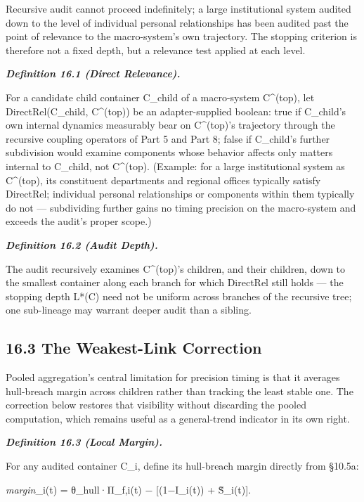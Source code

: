 \documentclass[
]{article}
\begin{document}
Recursive audit cannot proceed indefinitely; a large institutional
system audited down to the level of individual personal relationships
has been audited past the point of relevance to the macro-system's own
trajectory. The stopping criterion is therefore not a fixed depth, but a
relevance test applied at each level.

\emph{\textbf{Definition 16.1 (Direct Relevance).}}

For a candidate child container C\_child of a macro-system C\^{}(top),
let DirectRel(C\_child, C\^{}(top)) be an adapter-supplied boolean: true
if C\_child's own internal dynamics measurably bear on C\^{}(top)'s
trajectory through the recursive coupling operators of Part 5 and Part
8; false if C\_child's further subdivision would examine components
whose behavior affects only matters internal to C\_child, not
C\^{}(top). (Example: for a large institutional system as C\^{}(top),
its constituent departments and regional offices typically satisfy
DirectRel; individual personal relationships or components within them
typically do not --- subdividing further gains no timing precision on
the macro-system and exceeds the audit's proper scope.)

\emph{\textbf{Definition 16.2 (Audit Depth).}}

The audit recursively examines C\^{}(top)'s children, and their
children, down to the smallest container along each branch for which
DirectRel still holds --- the stopping depth L*(C) need not be uniform
across branches of the recursive tree; one sub-lineage may warrant
deeper audit than a sibling.

\hypertarget{the-weakest-link-correction}{%
\subsection{16.3 The Weakest-Link
Correction}\label{the-weakest-link-correction}}

Pooled aggregation's central limitation for precision timing is that it
averages hull-breach margin across children rather than tracking the
least stable one. The correction below restores that visibility without
discarding the pooled computation, which remains useful as a
general-trend indicator in its own right.

\emph{\textbf{Definition 16.3 (Local Margin).}}

For any audited container C\_i, define its hull-breach margin directly
from §10.5a:

\emph{margin}\_i(t) = θ\_hull·Π\_f,i(t) − {[}(1−I\_i(t)) + S̃\_i(t){]}.
\end{document}
